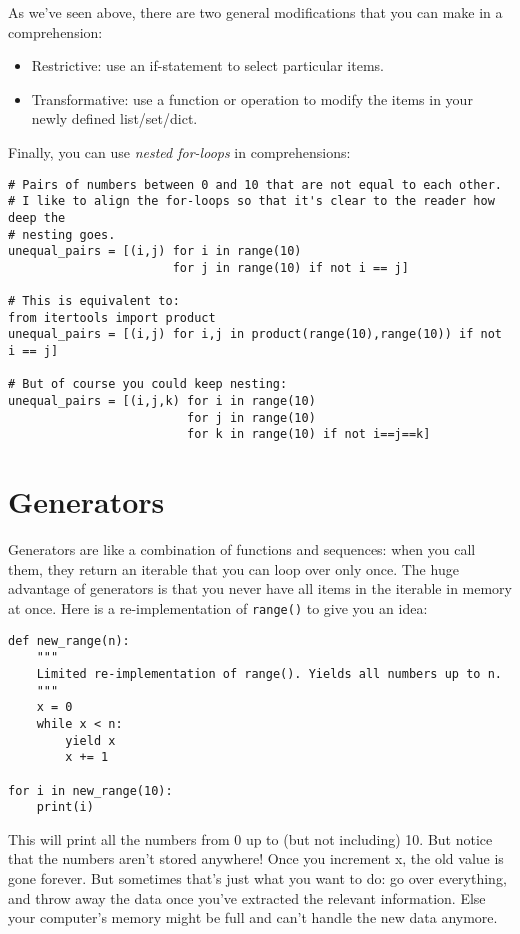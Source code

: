 \documentclass[12pt]{book}
\begin{document}
As we've seen above, there are two general modifications that you can make in a
comprehension:

\begin{itemize}
\item Restrictive: use an if-statement to select particular items.
\item Transformative: use a function or operation to modify the items in your newly defined list/set/dict.
\end{itemize}

Finally, you can use \emph{nested for-loops} in comprehensions:

\begin{lstlisting}
# Pairs of numbers between 0 and 10 that are not equal to each other.
# I like to align the for-loops so that it's clear to the reader how deep the
# nesting goes.
unequal_pairs = [(i,j) for i in range(10)
                       for j in range(10) if not i == j]

# This is equivalent to:
from itertools import product
unequal_pairs = [(i,j) for i,j in product(range(10),range(10)) if not i == j]

# But of course you could keep nesting:
unequal_pairs = [(i,j,k) for i in range(10)
                         for j in range(10)
                         for k in range(10) if not i==j==k]
\end{lstlisting}

\section{Generators}
Generators are like a combination of functions and sequences: when you call them, they return an iterable that you can loop over only once. The huge advantage of generators is that you never have all items in the iterable in memory at once. Here is a re-implementation of \texttt{range()} to give you an idea:

\begin{lstlisting}
def new_range(n):
    """
    Limited re-implementation of range(). Yields all numbers up to n.
    """
    x = 0
    while x < n:
        yield x
        x += 1

for i in new_range(10):
    print(i)
\end{lstlisting}

This will print all the numbers from 0 up to (but not including) 10. But notice
that the numbers aren't stored anywhere! Once you increment x, the old value is
gone forever. But sometimes that's just what you want to do: go over everything,
and throw away the data once you've extracted the relevant information. Else your
computer's memory might be full and can't handle the new data anymore.
\end{document}

